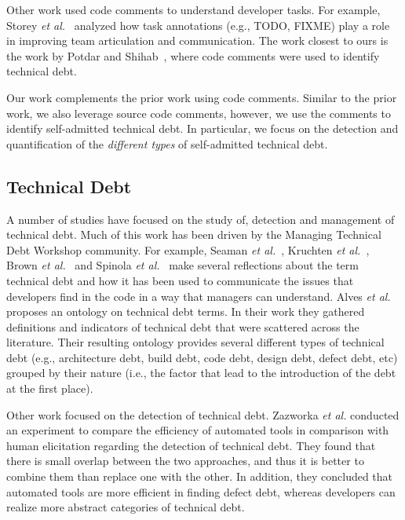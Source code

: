 Other work used code comments to understand developer tasks. For example, Storey \textit{et al.}~\cite{Storey2008ICSE} analyzed how task annotations (e.g., TODO, FIXME) play a role in improving team articulation and communication. The work closest to ours is the work by Potdar and Shihab~\cite{Potdar2014ICSME}, where code comments were used to identify technical debt. 

Our work complements the prior work using code comments. Similar to the prior work, we also leverage source code comments, however, we use the comments to identify self-admitted technical debt. In particular, we focus on the detection and quantification of the \emph{different types} of self-admitted technical debt.

\subsection{Technical Debt}

A number of studies have focused on the study of, detection and management of technical debt. Much of this work has been driven by the Managing Technical Debt Workshop community. For example, Seaman \textit{et al.}~\cite{Seaman2011}, Kruchten \textit{et al.}~\cite{Kruchten2013IWMTD}, Brown \textit{et al.}~\cite{Brown2010MTD} and Spinola \textit{et al.}~\cite{Spinola2013MTD}  make several reflections about the term technical debt and how it has been used to communicate the issues that developers find in the code in a way that managers can understand. Alves \textit{et al.}~\cite{Alves2014MTD} proposes an ontology on technical debt terms. In their work they gathered definitions and indicators of technical debt that were scattered across the literature. Their resulting ontology provides several different types of technical debt (e.g., architecture debt, build debt, code debt, design debt, defect debt, etc) grouped by their nature (i.e., the factor that lead to the introduction of the debt at the first place).  

Other work focused on the detection of technical debt. Zazworka \textit{et al.} \cite{Zazworka2013CSE} conducted an experiment to compare the efficiency of automated tools in comparison with human elicitation regarding the detection of technical debt. They found that there is small overlap between the two approaches, and thus it is better to combine them than replace one with the other. In addition, they concluded that automated tools are more efficient in finding defect debt, whereas developers can realize more abstract categories of technical debt.


